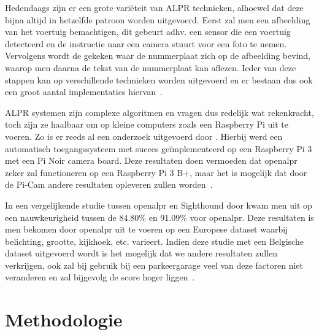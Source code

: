 Hedendaags zijn er een grote variëteit van ALPR technieken, alhoewel dat deze bijna altijd in hetzelfde patroon worden uitgevoerd. Eerst zal men een afbeelding van het voertuig bemachtigen, dit gebeurt adhv. een sensor die een voertuig detecteerd en de instructie naar een camera stuurt voor een foto te nemen. Vervolgens wordt de gekeken waar de nummerplaat zich op de afbeelding bevind, waarop men daarna de tekst van de nummerplaat kan aflezen. Ieder van deze stappen kan op verschillende technieken worden uitgevoerd en er bestaan dus ook een groot aantal implementaties hiervan~\autocite{azam2016automatic}.

ALPR systemen zijn complexe algoritmen en vragen dus redelijk wat rekenkracht, toch zijn ze haalbaar om op kleine computers zoals een Raspberry Pi uit te voeren. Zo is er reeds al een onderzoek uitgevoerd door \citeauthor{buhus2016automatic}. Hierbij werd een automatisch toegangssysteem met succes geïmplementeerd op een Raspberry Pi 3 met een Pi Noir camera board. Deze resultaten doen vermoeden dat openalpr zeker zal functioneren op een Raspberry Pi 3 B+, maar het is mogelijk dat door de Pi-Cam andere resultaten opleveren zullen worden~\autocite{buhus2016automatic}.

In een vergelijkende studie tussen openalpr en Sighthound door \citeauthor{masood2017license} kwam men uit op een nauwkeurigheid tussen de 84.80\% en 91.09\% voor openalpr. Deze resultaten is men bekomen door openalpr uit te voeren op een Europese dataset waarbij belichting, grootte, kijkhoek, etc. varieert. Indien deze studie met een Belgische dataset uitgevoerd wordt is het mogelijk dat we andere resultaten zullen verkrijgen, ook zal bij gebruik bij een parkeergarage veel van deze factoren niet veranderen en zal bijgevolg de score hoger liggen~\autocite{masood2017license}.


\section{Methodologie}
\label{sec:methodologie}

